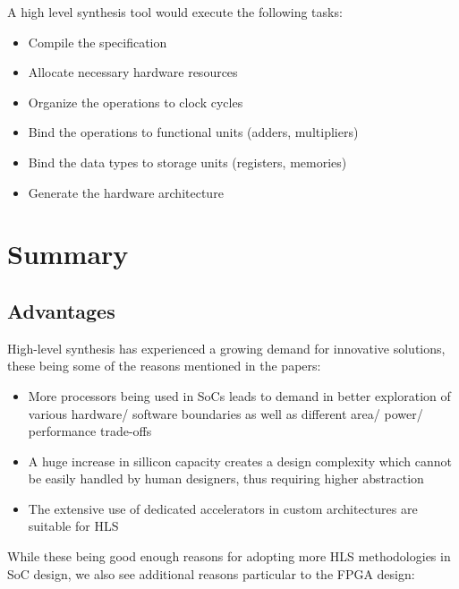 \documentclass{romjist}
\begin{document}
\quad A high level synthesis tool would execute the following tasks: 
\begin{itemize}
  \item Compile the specification
  \item Allocate necessary hardware resources
  \item Organize the operations to clock cycles
  \item Bind the operations to functional units (adders, multipliers)
  \item Bind the data types to storage units (registers, memories)
  \item Generate the hardware architecture
\end{itemize}



\section{Summary}


\subsection{Advantages} 



\quad High-level synthesis has experienced a growing demand for innovative solutions, these being some of the reasons mentioned in the papers:  

\begin{itemize}
  \item More processors being used in SoCs leads to demand in better exploration of various hardware/ software boundaries as well as different area/ power/ performance trade-offs
  \item A huge increase in sillicon capacity creates a design complexity which cannot be easily handled by human designers, thus requiring higher abstraction
  \item The extensive use of dedicated accelerators in custom architectures are suitable for HLS
\end{itemize}



While these being good enough reasons for adopting more HLS methodologies in SoC design, we also see additional reasons particular to the FPGA design:
\end{document}

